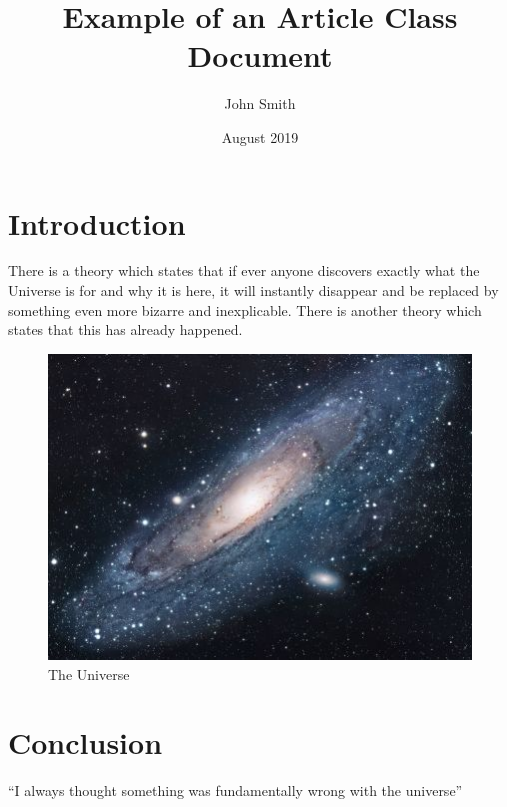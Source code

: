 \documentclass{article}
\title{Example of an Article Class Document}
\author{John Smith}
\date{August 2019}
\begin{document}
    \maketitle

    \section{Introduction}
    There is a theory which states that if ever anyone discovers exactly what the
    Universe is for and why it is here, it will instantly disappear and be replaced
    by something even more bizarre and inexplicable. There is another theory which
    states that this has already happened.

    \begin{figure}[h!]
        \centering
        \includegraphics[scale=1.7]{universe}
        \caption{The Universe}
        \label{fig:universe}
    \end{figure}

    \section{Conclusion}
    ``I always thought something was fundamentally wrong with the universe''
    \citep{adams1995hitchhiker}

    
    
\end{document}
